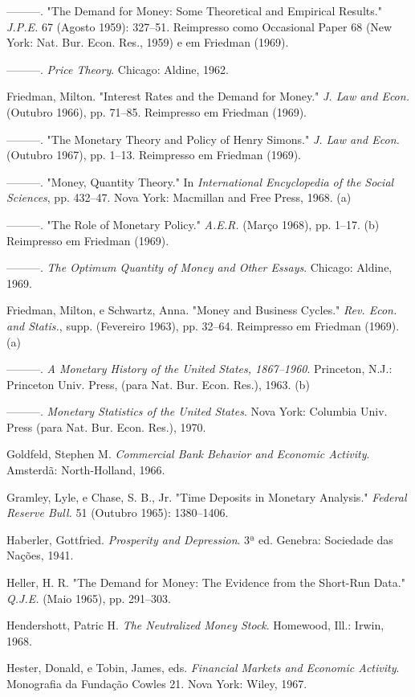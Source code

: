 \documentclass[12pt]{article}
\begin{document}
———. "The Demand for Money: Some Theoretical and Empirical Results." \textit{J.P.E.} 67 (Agosto 1959): 327–51. Reimpresso como Occasional Paper 68 (New York: Nat. Bur. Econ. Res., 1959) e em Friedman (1969).

———. \textit{Price Theory}. Chicago: Aldine, 1962.

Friedman, Milton. "Interest Rates and the Demand for Money." \textit{J. Law and Econ.} (Outubro 1966), pp. 71–85. Reimpresso em Friedman (1969).

———. "The Monetary Theory and Policy of Henry Simons." \textit{J. Law and Econ.} (Outubro 1967), pp. 1–13. Reimpresso em Friedman (1969).

———. "Money, Quantity Theory." In \textit{International Encyclopedia of the Social Sciences}, pp. 432–47. Nova York: Macmillan and Free Press, 1968. (a)

———. "The Role of Monetary Policy." \textit{A.E.R.} (Março 1968), pp. 1–17. (b) Reimpresso em Friedman (1969).

———. \textit{The Optimum Quantity of Money and Other Essays}. Chicago: Aldine, 1969.

Friedman, Milton, e Schwartz, Anna. "Money and Business Cycles." \textit{Rev. Econ. and Statis.}, supp. (Fevereiro 1963), pp. 32–64. Reimpresso em Friedman (1969). (a)

———. \textit{A Monetary History of the United States, 1867–1960}. Princeton, N.J.: Princeton Univ. Press, (para Nat. Bur. Econ. Res.), 1963. (b)

———. \textit{Monetary Statistics of the United States}. Nova York: Columbia Univ. Press (para Nat. Bur. Econ. Res.), 1970.

Goldfeld, Stephen M. \textit{Commercial Bank Behavior and Economic Activity}. Amsterdã: North-Holland, 1966.

Gramley, Lyle, e Chase, S. B., Jr. "Time Deposits in Monetary Analysis." \textit{Federal Reserve Bull.} 51 (Outubro 1965): 1380–1406.

Haberler, Gottfried. \textit{Prosperity and Depression}. 3ª ed. Genebra: Sociedade das Nações, 1941.

Heller, H. R. "The Demand for Money: The Evidence from the Short-Run Data." \textit{Q.J.E.} (Maio 1965), pp. 291–303.

Hendershott, Patric H. \textit{The Neutralized Money Stock}. Homewood, Ill.: Irwin, 1968.

Hester, Donald, e Tobin, James, eds. \textit{Financial Markets and Economic Activity}. Monografia da Fundação Cowles 21. Nova York: Wiley, 1967.
\end{document}
